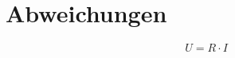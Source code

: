 \documentclass[../main.tex]{subfiles}
\begin{document}
\section{Abweichungen}

\begin{equation}
  U = R \cdot I
\end{equation}
\end{document}
